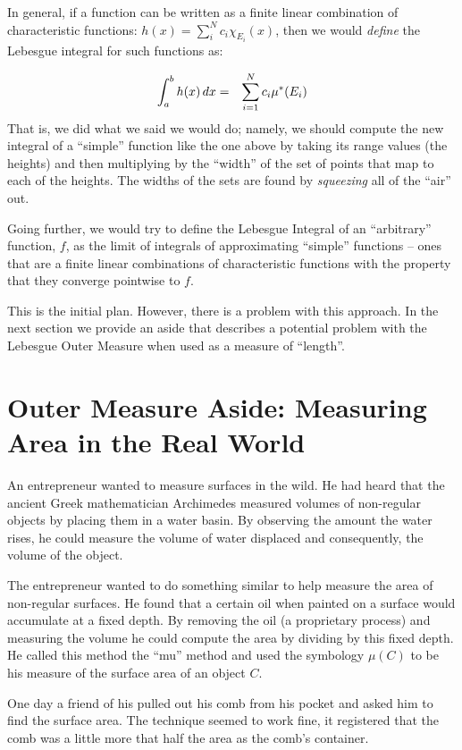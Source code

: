 \documentclass{article}
\begin{document}
In general, if a function can be written as a finite linear combination of 
characteristic functions: $h(x) = \sum_i^N c_i \chi_{E_i}(x)$,
then we would {\em define\/} the Lebesgue integral for such functions as:

\begin{eqnarray}
	\int_a^b h(x) \, dx & = & \sum_{i=1}^N\limits c_i \mu^*(E_i)
\end{eqnarray}
That is, we did what we said we would do; namely, we should compute the new integral 
of a ``simple'' function like the one above by taking its range values (the heights) 
and then multiplying by the ``width'' of the set of points that map to each of the heights. 
The widths of the sets are found by {\em squeezing\/} all of the ``air'' out.

Going further, we would try to define the Lebesgue Integral of an ``arbitrary''
function, $f$, as the limit of integrals of approximating ``simple'' functions  -- ones that
are a finite linear combinations of characteristic functions with the property
that they converge pointwise to $f$.

This is the initial plan. However, there is a problem with this approach. In the next section we 
provide an aside that describes a potential problem with the Lebesgue Outer Measure when 
used as a measure of ``length''.


\section{Outer Measure Aside: Measuring Area in the Real World}
An entrepreneur 
wanted to measure surfaces in the wild. He had heard that the 
ancient Greek mathematician Archimedes measured volumes of non-regular objects 
by placing them in a water basin. By observing the amount the water rises, he 
could measure the volume of water displaced and consequently, the volume of the object.

The entrepreneur wanted to do something similar to help measure the area of 
non-regular surfaces. He found that a 
certain oil when painted on a surface would accumulate at a fixed depth. By 
removing the oil (a proprietary process) and measuring the volume he could 
compute the area by dividing by this fixed depth. He called this method the 
``mu'' method and used the symbology $\mu(C)$ to be his measure of the surface 
area of an object $C$.

One day a friend of his pulled out his comb from his pocket and asked him to 
find the surface area. The technique seemed to work fine, it registered that 
the comb was a little more that half the area as the comb's container.
\end{document}
